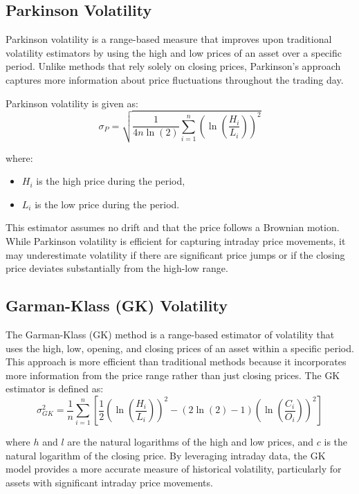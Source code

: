 \documentclass[letterpaper,11pt]{article}
\begin{document}
\subsection{Parkinson Volatility}
Parkinson volatility is a range-based measure that improves upon traditional volatility estimators by using the high and low prices of an asset over a specific period. Unlike methods that rely solely on closing prices, Parkinson's approach captures more information about price fluctuations throughout the trading day.

Parkinson volatility is given as:
\[
\sigma_P = \sqrt{\frac{1}{4n \ln(2)} \sum_{i=1}^n \left( \ln\left(\frac{H_i}{L_i}\right) \right)^2 }
\]

where:
\begin{itemize}
    \item \( H_i \) is the high price during the period,
    \item \( L_i \) is the low price during the period.
\end{itemize}

This estimator assumes no drift and that the price follows a Brownian motion. While Parkinson volatility is efficient for capturing intraday price movements, it may underestimate volatility if there are significant price jumps or if the closing price deviates substantially from the high-low range.



\subsection{Garman-Klass (GK) Volatility}
The Garman-Klass (GK) method is a range-based estimator of volatility that uses the high, low, opening, and closing prices of an asset within a specific period. This approach is more efficient than traditional methods because it incorporates more information from the price range rather than just closing prices. The GK estimator is defined as:
\[
\sigma_{GK}^2 = \frac{1}{n} \sum_{i=1}^n \left[ \frac{1}{2} \left( \ln\left(\frac{H_i}{L_i}\right) \right)^2 - \left(2\ln(2) - 1\right) \left( \ln\left(\frac{C_i}{O_i}\right) \right)^2 \right]
\]


where \( h \) and \( l \) are the natural logarithms of the high and low prices, and \( c \) is the natural logarithm of the closing price. By leveraging intraday data, the GK model provides a more accurate measure of historical volatility, particularly for assets with significant intraday price movements.
\end{document}
